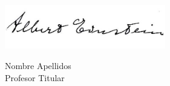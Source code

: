 \documentclass[noDatosCabecera, noDatosPie]{UGR-generico}
\newcommand{\miNombre}{Nombre Apellidos\xspace}
\newcommand{\miCargo}{Profesor Titular\xspace}
\begin{document}
\vfill\vfill
\begin{center}

  \includegraphics[width=7cm]{img/firma}

  \begin{bfseries}
  \miNombre\\\smallskip
  \miCargo
  \end{bfseries}
\end{center}
\vfill



%
\end{document}
